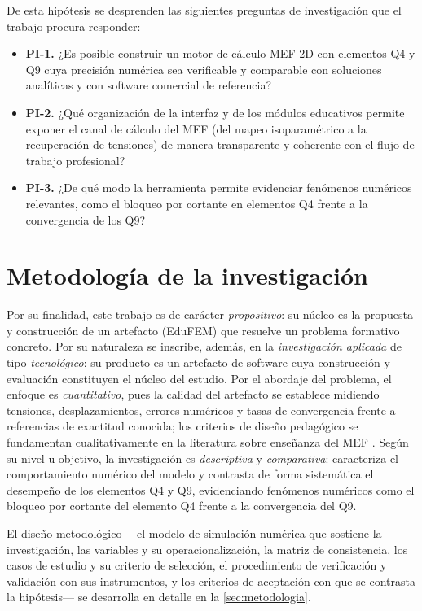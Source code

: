 De esta hipótesis se desprenden las siguientes preguntas de investigación que el trabajo procura responder:

\begin{itemize}
    \item \textbf{PI-1.} ¿Es posible construir un motor de cálculo MEF 2D con elementos Q4 y Q9 cuya precisión numérica sea verificable y comparable con soluciones analíticas y con software comercial de referencia?
    \item \textbf{PI-2.} ¿Qué organización de la interfaz y de los módulos educativos permite exponer el canal de cálculo del MEF (del mapeo isoparamétrico a la recuperación de tensiones) de manera transparente y coherente con el flujo de trabajo profesional?
    \item \textbf{PI-3.} ¿De qué modo la herramienta permite evidenciar fenómenos numéricos relevantes, como el bloqueo por cortante en elementos Q4 frente a la convergencia de los Q9?
\end{itemize}

\section*{Metodología de la investigación}

Por su finalidad, este trabajo es de carácter \emph{propositivo}: su núcleo es la propuesta y construcción de un artefacto (EduFEM) que resuelve un problema formativo concreto. Por su naturaleza se inscribe, además, en la \emph{investigación aplicada} de tipo \emph{tecnológico}: su producto es un artefacto de software cuya construcción y evaluación constituyen el núcleo del estudio. Por el abordaje del problema, el enfoque es \emph{cuantitativo}, pues la calidad del artefacto se establece midiendo tensiones, desplazamientos, errores numéricos y tasas de convergencia frente a referencias de exactitud conocida; los criterios de diseño pedagógico se fundamentan cualitativamente en la literatura sobre enseñanza del MEF \autocite[p.~168]{lee2015interactive}. Según su nivel u objetivo, la investigación es \emph{descriptiva} y \emph{comparativa}: caracteriza el comportamiento numérico del modelo y contrasta de forma sistemática el desempeño de los elementos Q4 y Q9, evidenciando fenómenos numéricos como el bloqueo por cortante del elemento Q4 frente a la convergencia del Q9.

El diseño metodológico —el modelo de simulación numérica que sostiene la investigación, las variables y su operacionalización, la matriz de consistencia, los casos de estudio y su criterio de selección, el procedimiento de verificación y validación con sus instrumentos, y los criterios de aceptación con que se contrasta la hipótesis— se desarrolla en detalle en la \autoref{sec:metodologia}.

